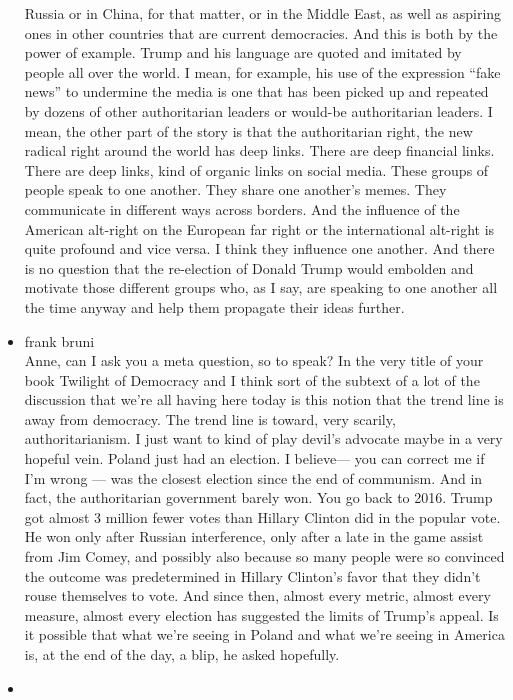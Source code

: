 \begin{itemize}
  Russia or in China, for that matter, or in the Middle East, as well as
  aspiring ones in other countries that are current democracies. And
  this is both by the power of example. Trump and his language are
  quoted and imitated by people all over the world. I mean, for example,
  his use of the expression ``fake news'' to undermine the media is one
  that has been picked up and repeated by dozens of other authoritarian
  leaders or would-be authoritarian leaders. I mean, the other part of
  the story is that the authoritarian right, the new radical right
  around the world has deep links. There are deep financial links. There
  are deep links, kind of organic links on social media. These groups of
  people speak to one another. They share one another's memes. They
  communicate in different ways across borders. And the influence of the
  American alt-right on the European far right or the international
  alt-right is quite profound and vice versa. I think they influence one
  another. And there is no question that the re-election of Donald Trump
  would embolden and motivate those different groups who, as I say, are
  speaking to one another all the time anyway and help them propagate
  their ideas further.
\item
  frank bruni\\
  Anne, can I ask you a meta question, so to speak? In the very title of
  your book Twilight of Democracy and I think sort of the subtext of a
  lot of the discussion that we're all having here today is this notion
  that the trend line is away from democracy. The trend line is toward,
  very scarily, authoritarianism. I just want to kind of play devil's
  advocate maybe in a very hopeful vein. Poland just had an election. I
  believe--- you can correct me if I'm wrong --- was the closest
  election since the end of communism. And in fact, the authoritarian
  government barely won. You go back to 2016. Trump got almost 3 million
  fewer votes than Hillary Clinton did in the popular vote. He won only
  after Russian interference, only after a late in the game assist from
  Jim Comey, and possibly also because so many people were so convinced
  the outcome was predetermined in Hillary Clinton's favor that they
  didn't rouse themselves to vote. And since then, almost every metric,
  almost every measure, almost every election has suggested the limits
  of Trump's appeal. Is it possible that what we're seeing in Poland and
  what we're seeing in America is, at the end of the day, a blip, he
  asked hopefully.
\item

\end{itemize}
